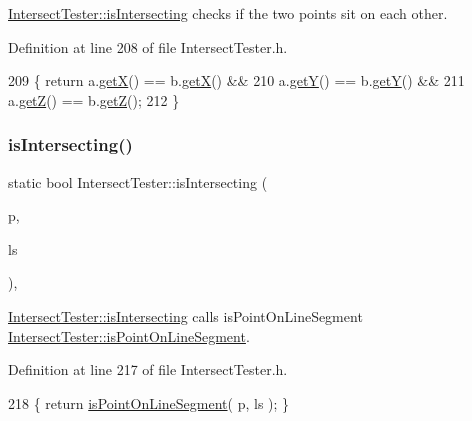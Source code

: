 \hyperlink{class_intersect_tester_a7710e17ff7d2e229059f23b9429213f5}{Intersect\+Tester\+::is\+Intersecting} checks if the two points sit on each other. 



Definition at line 208 of file Intersect\+Tester.\+h.


\begin{DoxyCode}
209     \{ \textcolor{keywordflow}{return} a.\hyperlink{class_point_a29c44ec7c7279e02629645a06cdaf7d5}{getX}() == b.\hyperlink{class_point_a29c44ec7c7279e02629645a06cdaf7d5}{getX}() &&
210              a.\hyperlink{class_point_a2371ffadbe245d12a8f556d0a976521b}{getY}() == b.\hyperlink{class_point_a2371ffadbe245d12a8f556d0a976521b}{getY}() &&
211              a.\hyperlink{class_point_a9bb9987e32b7dd8dec81ead5d428446c}{getZ}() == b.\hyperlink{class_point_a9bb9987e32b7dd8dec81ead5d428446c}{getZ}();
212     \}
\end{DoxyCode}
\mbox{\label{class_intersect_tester_acc62b7619356707ae3295e2fab1694ae}} 
\subsubsection{\texorpdfstring{is\+Intersecting()}{isIntersecting()}\hspace{0.1cm}{\footnotesize\ttfamily [2/15]}}
{\footnotesize\ttfamily static bool Intersect\+Tester\+::is\+Intersecting (\begin{DoxyParamCaption}\item[{\hyperlink{class_point}{Point}}]{p,  }\item[{\hyperlink{class_line_segment}{Line\+Segment}}]{ls }\end{DoxyParamCaption})\hspace{0.3cm}{\ttfamily [inline]}, {\ttfamily [static]}}



\hyperlink{class_intersect_tester_a7710e17ff7d2e229059f23b9429213f5}{Intersect\+Tester\+::is\+Intersecting} calls is\+Point\+On\+Line\+Segment  \hyperlink{class_intersect_tester_a95ba0d50e91eb8559aa3c6a4dc0d4c0f}{Intersect\+Tester\+::is\+Point\+On\+Line\+Segment}. 



Definition at line 217 of file Intersect\+Tester.\+h.


\begin{DoxyCode}
218     \{ \textcolor{keywordflow}{return} \hyperlink{class_intersect_tester_a95ba0d50e91eb8559aa3c6a4dc0d4c0f}{isPointOnLineSegment}( p, ls ); \}
\end{DoxyCode}
\mbox{\label{class_intersect_tester_a12df0518a663c87dcfcc299e9cd6c07f}} 
